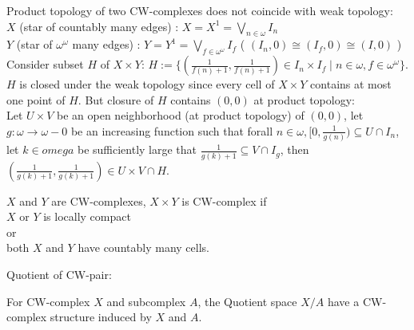     \begin{exmp}
        Product topology of two CW-complexes does not coincide with weak topology:\\
        $X$ (star of countably many edges) :
        $X = X^1 = \bigvee_{n\in \omega} I_n $\\
        $Y$ (star of $\omega^{\omega}$ many edges) :
        $Y = Y^1 = \bigvee_{f \in \omega^{\omega}} I_f $
        ( $(I_n,0) \cong (I_f,0) \cong (I,0) $ )\\
        Consider subset $H$ of $X \times Y$:
        $H := \{ (\frac{1}{f(n)+1} , \frac{1}{f(n)+1}) \in I_n \times I_f \mid n \in \omega, f \in \omega^{\omega} \}$.\\
        $H$ is closed under the weak topology
        since every cell of $X \times Y$ contains at most one point of $H$.
        But closure of $H$ contains $(0,0)$ at product topology:\\
        Let $U \times V$ be an open neighborhood (at product topology) of $(0,0)$,
        let $g : \omega \to \omega - 0$ be an increasing function such that
        forall $n \in \omega, [0,\frac{1}{g(n)}) \subseteq U \cap I_n$,
        let $k \in omega$ be sufficiently large that $\frac{1}{g(k)+1} \subseteq V \cap I_g$,
        then $(\frac{1}{g(k)+1} , \frac{1}{g(k)+1}) \in U \times V \cap H$.

    \end{exmp}

    \begin{prop}
        $X$ and $Y$ are CW-complexes, $X \times Y$ is CW-complex if\\
        $X$ or $Y$ is locally compact\\
        or\\
        both $X$ and $Y$ have countably many cells.
    \end{prop}

    Quotient of CW-pair:

    \begin{prop}
        For CW-complex $X$ and subcomplex $A$, the Quotient space $X/A$ 
        have a CW-complex structure induced by $X$ and $A$.
    \end{prop}

